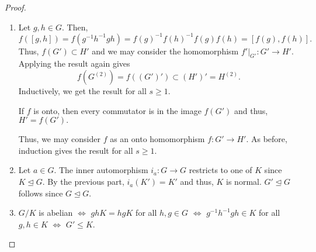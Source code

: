 \commutatorresults*\label{prop:commutatorresults2}
\begin{flushright}\hyperref[prop:commutatorresults]{\upsym}\end{flushright}
\begin{proof}
    \phantom{hi}
    \begin{enumerate}[leftmargin=*]
        \item Let $g, h \in G.$ Then, 
        \begin{equation*} 
            f([g, h]) = f(g^{-1}h^{-1}gh) = f(g)^{-1}f(h)^{-1}f(g)f(h) = [f(g), f(h)].
        \end{equation*}
        Thus, $f(G') \subset H'$ and we may consider the homomorphism $f'|_{G'} : G' \to H'.$ Applying the result again gives
        \begin{equation*} 
            f(G^{(2)}) = f((G')') \subset (H')' = H^{(2)}.
        \end{equation*}  
        Inductively, we get the result for all $s \ge 1.$

        If $f$ is onto, then every commutator is in the image $f(G')$ and thus, $H' = f(G').$

        Thus, we may consider $f$ as an onto homomorphism $f : G' \to H'.$ As before, induction gives the result for all $s \ge 1.$
        \item Let $a \in G.$ The inner automorphism $i_a : G \to G$ restricts to one of $K$ since $K \unlhd G.$ By the previous part, $i_a(K') = K'$ and thus, $K$ is normal. $G' \unlhd G$ follows since $G \unlhd G.$
        \item $G/K$ is abelian $\iff$ $ghK = hgK$ for all $h, g \in G$ $\iff$ $g^{-1}h^{-1}gh \in K$ for all $g, h \in K$ $\iff$ $G' \le K.$ \qedhere
    \end{enumerate}
\end{proof}

